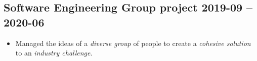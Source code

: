 \documentclass[cv.tex]{subfiles}
\begin{document}
    \subsection{Software Engineering Group project
    \hfill 2019-09 -- 2020-06}
        \begin{itemize}
            \item Managed the ideas of a \emph{diverse group} of people to
                create a \emph{cohesive solution} to an \emph{industry
                challenge}.
        \end{itemize}

\end{document}
